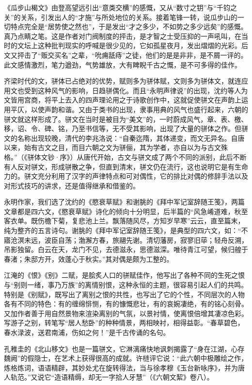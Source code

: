 《瓜步山楬文》由登高望远引出“意类交横”的感慨，又从“数寸之钥”与“千钧之关”的关系，引发出人的“才施”与所处地位的关系。接着笔锋一转，说瓜步山的一切特点完全是“居势使之然也”，于是发出“才之多少，不如势之多少远矣”的感慨。真乃点睛之笔。这是作者对门阀制度的抨击，是才智之士受压抑的一声吼叫，在当时的文坛上这种批判现实的呼喊是很少见的，它如孤星夜月，发出熠熠的光彩。后文又抨击了“贩交买名”之辈，“吮痈舐痔”之徒，他们的是是非非，是不屑一评的。此文感情激烈，笔力遒劲，气势雄放，大有睥睨千古之慨，是不可多得的佳作。

齐梁时代的文，骈体已占绝对的优势，赋则多为骈体赋，文则多为骈体文，就连应用文也受到这种风气的影响，日趋骈偶化。而且“永明声律说”的出现，沈约等人为文皆用宫商，将平上去入的四声理论用之于诗歌创作中，这就促使骈文在声韵上运用平仄，以使声韵和谐。又由于类书的出现，隶事用典的风气也盛行起来，六朝的骈文就这样形成了。骈文在当时是被目为“美文”的，一时蔚成风气，章、表、檄、移，诏、令、碑、铭，乃至书信等，无不受其影响，出现了大量的骈体之作。但骈文的名称出现较晚，清代的李兆洛说：“自秦迄隋，其体递变，而文无异名。自唐以来，始有古文之目，而目六朝之文为骈俪，其为学者，亦自以为与古文殊格。”（《骈体文钞·序》）从唐代开始，古文与骈文成了两个不同的派别，此后不断有人反对骈文，形成骈散之争，但直到清末，骈文仍在流行，这也说明它是有生命力的。骈文充分利用了汉字的声律特点和可对偶性，它的排比对偶的修辞手法以及对形式技巧的讲求，还是值得继承和借鉴的。

永明作家，我们选了沈约的《愍衰草赋》和谢朓的《拜中军记室辞随王笺》，两篇文章都是四六文，《愍衰草赋》诗化的倾向十分明显，后半篇的“风急崤道难，秋至客衣单。既伤檐下菊，复悲池上兰。飘落随风尽，方知岁早寒”云云，直至篇末，纯为整齐的五言诗句。谢朓的《拜中军记室辞随王笺》，是典型的四六文，如：“不寤沧溟未远，波臣自荡；渤澥方春，旅翮先谢。清切藩房，寂寥旧荜；轻舟反溯，吊影独留。白云在天，龙门不见，去德滋永，思德滋深。唯待青江可望，候归艎于春渚；朱邸方开，效蓬心于秋实。”其对偶是颇为工整的。

江淹的《恨》《别》二赋，是脍炙人口的骈赋佳作，他写出了各种不同的生死之恨与“别则一绪，事乃万族”的离情别恨，这种永恒的主题，很容易引起人们的共鸣。特别是《别赋》，既写出了离别之恨的共性，也写出了它的个性，不同层次的人物各有不同的特色：有的缠绵悱恻，有的慷慨悲壮，有的哀婉凄绝，有的铭心刻骨。又加作者善于用自然景物来渲染离别的气氛，以景衬情，使离恨倍增其凄凉色彩。写游子之别，转笔写“居人愁卧”的种种情景，两相映衬，相得益彰。“春草碧色，春水渌波，送君南浦，伤如之何！”是千古传诵的名句。

孔稚圭的《北山移文》也是一篇骈文，它淋漓痛快地讽刺揭露了“身在江湖，心存魏阙”的假隐士，在艺术上获得很高的成就。许梿评它说：“此六朝中极雕绘之作，炼格炼词，语语精辟，其妙处尤在旋转得法，当与徐孝穆《玉台新咏序》，并为唐人轨范。”又说它“造语精缛，却无一字拾人牙慧”（《六朝文絜》卷八）。


